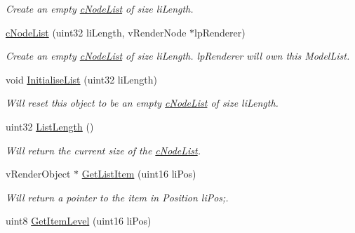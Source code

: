 \begin{DoxyCompactItemize}
\begin{DoxyCompactList}\small\item\em Create an empty \hyperlink{classc_node_list}{cNodeList} of size liLength. \end{DoxyCompactList}\item 
\hypertarget{classc_node_list_a8ecb433584d7a475b99a3c9cd60e5e04}{
\hyperlink{classc_node_list_a8ecb433584d7a475b99a3c9cd60e5e04}{cNodeList} (uint32 liLength, vRenderNode $\ast$lpRenderer)}
\label{classc_node_list_a8ecb433584d7a475b99a3c9cd60e5e04}

\begin{DoxyCompactList}\small\item\em Create an empty \hyperlink{classc_node_list}{cNodeList} of size liLength. lpRenderer will own this ModelList. \end{DoxyCompactList}\item 
\hypertarget{classc_node_list_a3faa29a71ceef380e6f20dba604699d2}{
void \hyperlink{classc_node_list_a3faa29a71ceef380e6f20dba604699d2}{InitialiseList} (uint32 liLength)}
\label{classc_node_list_a3faa29a71ceef380e6f20dba604699d2}

\begin{DoxyCompactList}\small\item\em Will reset this object to be an empty \hyperlink{classc_node_list}{cNodeList} of size liLength. \end{DoxyCompactList}\item 
\hypertarget{classc_node_list_ac65144d32e74e45f7b76904cb8f8f28a}{
uint32 \hyperlink{classc_node_list_ac65144d32e74e45f7b76904cb8f8f28a}{ListLength} ()}
\label{classc_node_list_ac65144d32e74e45f7b76904cb8f8f28a}

\begin{DoxyCompactList}\small\item\em Will return the current size of the \hyperlink{classc_node_list}{cNodeList}. \end{DoxyCompactList}\item 
\hypertarget{classc_node_list_a7e735bd25bac7a9c46956b4b93f025f8}{
vRenderObject $\ast$ \hyperlink{classc_node_list_a7e735bd25bac7a9c46956b4b93f025f8}{GetListItem} (uint16 liPos)}
\label{classc_node_list_a7e735bd25bac7a9c46956b4b93f025f8}

\begin{DoxyCompactList}\small\item\em Will return a pointer to the item in Position liPos;. \end{DoxyCompactList}\item 
\hypertarget{classc_node_list_a8fa44ba24901aa9dd318d97e4202f7bb}{
uint8 \hyperlink{classc_node_list_a8fa44ba24901aa9dd318d97e4202f7bb}{GetItemLevel} (uint16 liPos)}
\label{classc_node_list_a8fa44ba24901aa9dd318d97e4202f7bb}


\end{DoxyCompactItemize}
